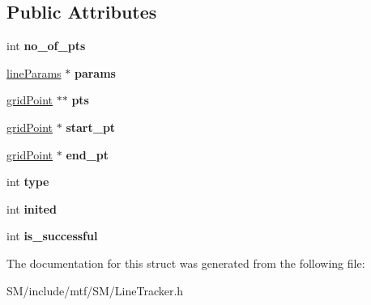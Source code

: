 \subsection*{Public Attributes}
\begin{DoxyCompactItemize}
\item 
\hypertarget{structgridLine_ac8dc3cd39f72773e274f39c0e5e97c06}{int {\bfseries no\-\_\-of\-\_\-pts}}\label{structgridLine_ac8dc3cd39f72773e274f39c0e5e97c06}

\item 
\hypertarget{structgridLine_ac171008c86f36f23688162b69668b58b}{\hyperlink{structlineParams}{line\-Params} $\ast$ {\bfseries params}}\label{structgridLine_ac171008c86f36f23688162b69668b58b}

\item 
\hypertarget{structgridLine_ab889d21c3255f58158d871bfb788eedf}{\hyperlink{structgridPoint}{grid\-Point} $\ast$$\ast$ {\bfseries pts}}\label{structgridLine_ab889d21c3255f58158d871bfb788eedf}

\item 
\hypertarget{structgridLine_afd57b5647958c0ee2adf0fba4f7f1c05}{\hyperlink{structgridPoint}{grid\-Point} $\ast$ {\bfseries start\-\_\-pt}}\label{structgridLine_afd57b5647958c0ee2adf0fba4f7f1c05}

\item 
\hypertarget{structgridLine_a519f0321a3cad03c21358ff208acabeb}{\hyperlink{structgridPoint}{grid\-Point} $\ast$ {\bfseries end\-\_\-pt}}\label{structgridLine_a519f0321a3cad03c21358ff208acabeb}

\item 
\hypertarget{structgridLine_a76a70d02929bf1e72408e0a112130544}{int {\bfseries type}}\label{structgridLine_a76a70d02929bf1e72408e0a112130544}

\item 
\hypertarget{structgridLine_a23c9e0c917879e312993a813b575a985}{int {\bfseries inited}}\label{structgridLine_a23c9e0c917879e312993a813b575a985}

\item 
\hypertarget{structgridLine_a05c6ee7eaed9f54686cf386ffd25fd92}{int {\bfseries is\-\_\-successful}}\label{structgridLine_a05c6ee7eaed9f54686cf386ffd25fd92}

\end{DoxyCompactItemize}


The documentation for this struct was generated from the following file\-:\begin{DoxyCompactItemize}
\item 
S\-M/include/mtf/\-S\-M/Line\-Tracker.\-h\end{DoxyCompactItemize}
